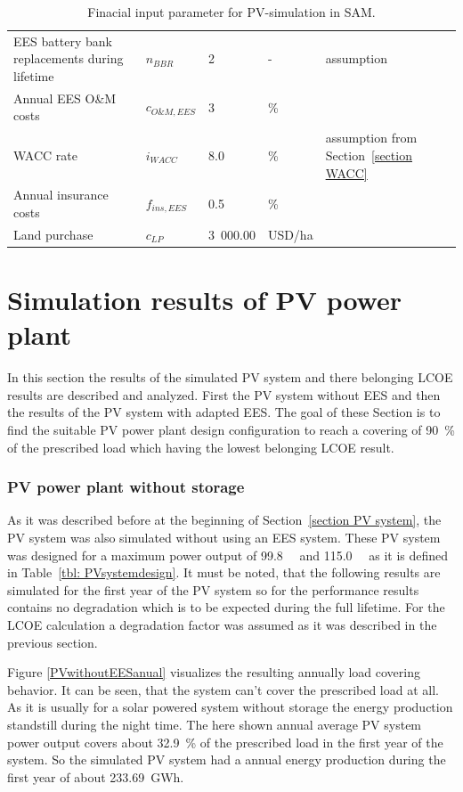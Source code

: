 \begin{table}[!h]
\begin{tabular}{  p{5.4cm} C{1.5cm} C{1.5cm}  C{1.7cm}  C{4.0cm} }
EES battery bank replacements during lifetime & $n_{BBR}$ & 2 & - & assumption \\ 
Annual EES O\&M costs & $c_{O\&M,EES}$ & 3 & \% & \cite{IEA2014c}\\
WACC rate & $i_{WACC}$ & 8.0 & \si{\percent} & assumption from Section~\ref{section WACC} \\ 
Annual insurance costs& $f_{ins,EES}$ & 0.5 & \% & \cite{Cutter2014}\\ \hline
Land purchase &$c_{LP}$ & 3~000.00 & USD/ha & \cite{Cassell2012} \\ 
\hline
\end{tabular}
\caption[Finacial input parameter for PV-simulation in SAM.]{Finacial input parameter for PV-simulation in SAM.}\label{tbl: PVFinance}
\end{table}
\pagebreak
\section{Simulation results of PV power plant}
In this section the results of the simulated PV system and there belonging LCOE results are described and analyzed. First the PV system without EES and then the results of the PV system with adapted EES. The goal of these Section is to find the suitable PV power plant design configuration to reach a covering of \SI{90}{\percent} of the prescribed load which having the lowest belonging LCOE result.
\subsubsection{PV power plant without storage}
As it was described before at the beginning of Section~\ref{section PV system}, the PV system was also simulated without using an EES system. These PV system was designed for a maximum power output of \SI{99.8}{\mega\wattsac} and \SI{115.0}{\mega\wattsdc} as it is defined in Table~\ref{tbl: PVsystemdesign}. It must be noted, that the following results are simulated for the first year of the PV system so for the performance results contains no degradation which is to be expected during the full lifetime. For the LCOE calculation a degradation factor was assumed as it was described in the previous section. 

Figure \ref{PVwithoutEESanual} visualizes the resulting annually load covering behavior. It can be seen, that the system can't cover the prescribed load at all. As it is usually for a solar powered system without storage the energy production standstill during the night time. The here shown annual average PV system power output covers about \SI{32.9}{\percent} of the prescribed load in the first year of the system. So the simulated PV system had a annual energy production during the first year of about \SI{233.69}{GWh}.

